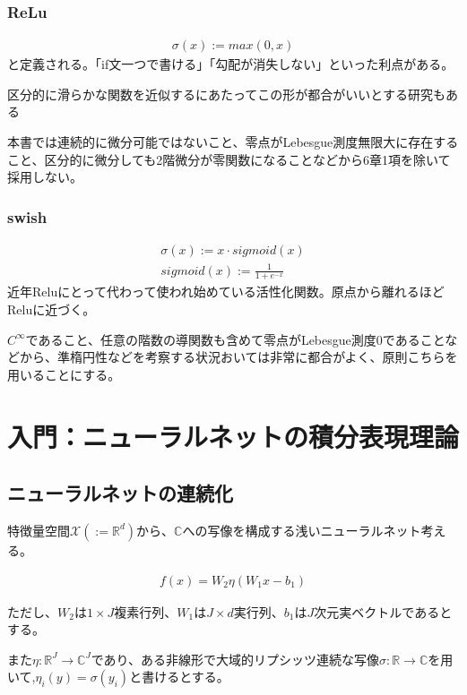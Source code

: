 \documentclass{jsarticle}
\begin{document}
\subsubsection{ReLu}
\begin{align}
\sigma(x):=max(0,x)
\end{align}
と定義される。「if文一つで書ける」「勾配が消失しない」といった利点がある。

区分的に滑らかな関数を近似するにあたってこの形が都合がいいとする研究もある

本書では連続的に微分可能ではないこと、零点がLebesgue測度無限大に存在すること、区分的に微分しても2階微分が零関数になることなどから6章1項を除いて採用しない。

\subsubsection{swish}
\begin{align}
\sigma(x):=x\cdot sigmoid(x)\\
sigmoid(x):=\frac{1}{1+e^{-x}}
\end{align}
近年Reluにとって代わって使われ始めている活性化関数。原点から離れるほどReluに近づく。

$C^\infty$であること、任意の階数の導関数も含めて零点がLebesgue測度0であることなどから、準楕円性などを考察する状況おいては非常に都合がよく、原則こちらを用いることにする。

\newpage
\section{入門：ニューラルネットの積分表現理論}

\subsection{ニューラルネットの連続化}

特徴量空間$\mathcal{X}(:=\mathbb{R}^d)$から、$\mathbb{C}$への写像を構成する浅いニューラルネット考える。

\begin{align}
f(x)=W_2\eta(W_1x-b_1)
\end{align}


ただし、$W_2$は$1\times J$複素行列、$W_1$は$J\times d$実行列、$b_1$は$J$次元実ベクトルであるとする。

また$\eta:\mathbb{R}^J\to\mathbb{C}^J$であり、ある非線形で大域的リプシッツ連続な写像$\sigma:\mathbb{R}\to\mathbb{C}$を用いて,$\eta_i(y)=\sigma(y_i)$と書けるとする。
\end{document}
